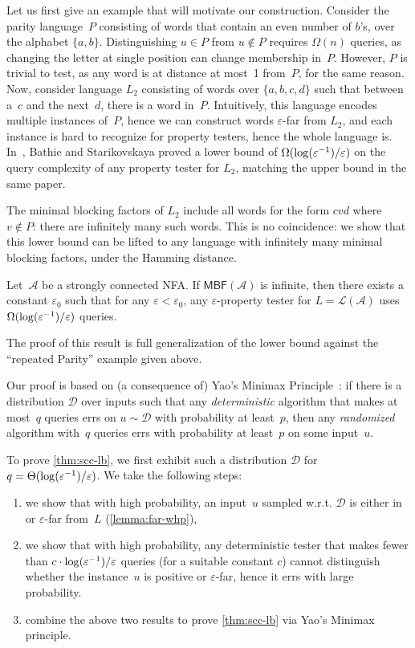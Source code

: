 \documentclass[letterpaper, USenglish, cleveref, autoref, thm-restate, numberwithinsect]{lipics-v2021}
\theoremstyle{theorem}
\theoremstyle{definition}
\newcommand{\Aa}{\mathcal{A}}
\newcommand{\Dd}{\mathcal{D}}
\newcommand{\eps}{\varepsilon}
\newcommand{\lang}[1]{\mathcal{L}(#1)}
\newcommand{\MBF}{\textsf{MBF}\xspace}
\newcommand{\set}[1]{\{ #1 \}}
\newcommand{\epslogeps}[1][]
{\ifthenelse{\equal{#1}{}}{\log(\eps^{-1})/\eps}{\log^{ #1 }(\eps^{-1})/\eps}}
\begin{document}
Let us first give an example that will motivate our construction. 
Consider the parity language~$P$ consisting of words that contain an even number of $b$'s, over the alphabet $\set{a,b}$.
Distinguishing $u \in P$ from $u \notin P$ requires $\Omega(n)$ queries, as changing the letter at single position can change membership in~$P$. However, $P$ is trivial to test, as any word is at distance at most~1 from~$P$, for the same reason.
Now, consider language $L_2$ consisting of words over $\set{a,b,c,d}$ such that between a~$c$ and the next~$d$, there is a word in~$P$. Intuitively, this language encodes multiple instances of~$P$, hence we can construct words $\eps$-far from $L_2$, and each instance is hard to recognize for property testers, hence the whole language is.
In~\cite[Theorem 15]{bathie2021property}, Bathie and Starikovskaya proved a lower bound of $\Omega(\epslogeps)$ on the query complexity of any property tester for $L_2$, matching the upper bound in the same paper. 

The minimal blocking factors of $L_2$ include all words for the form $cvd$ where $v\notin P$: there are infinitely many such words.
This is no coincidence: we show that this lower bound can be lifted to any language with infinitely many minimal blocking factors, under the Hamming distance.

\begin{theorem}\label{thm:scc-lb}
    Let~$\Aa$ be a strongly connected NFA.
    If $\MBF(\Aa)$ is infinite, then there exists a constant $\eps_0$ such that for any $\eps <\eps_0$, any $\eps$-property tester for $L = \lang{\Aa}$ uses $\Omega(\epslogeps)$ queries.
\end{theorem}
The proof of this result is full generalization of the lower bound against the ``repeated Parity'' example given above.

Our proof is based on (a consequence of) Yao's Minimax Principle~\cite{yao1977probabilistic}: if there is a distribution $\Dd$ over inputs such that any \emph{deterministic} algorithm that makes at most~$q$ queries errs on $u\sim{} \Dd$ with probability at least~$p$, then any \emph{randomized} algorithm with~$q$ queries errs with probability at least~$p$ on some input~$u$.

To prove \cref{thm:scc-lb}, we first exhibit such a distribution $\Dd$ for $q = \Theta(\epslogeps)$.
We take the following steps:
\begin{enumerate}
    \item we show that with high probability, an input~$u$ sampled w.r.t. $\Dd$ is either in or $\eps$-far from~$L$ (\cref{lemma:far-whp}),
    \item we show that with high probability, any deterministic tester that makes fewer than $c \cdot \epslogeps$ queries (for a suitable constant $c$) cannot distinguish whether the instance~$u$ is positive or $\eps$-far, hence it errs with large probability.
    \item combine the above two results to prove \cref{thm:scc-lb} via Yao's Minimax principle.
\end{enumerate}
\end{document}
